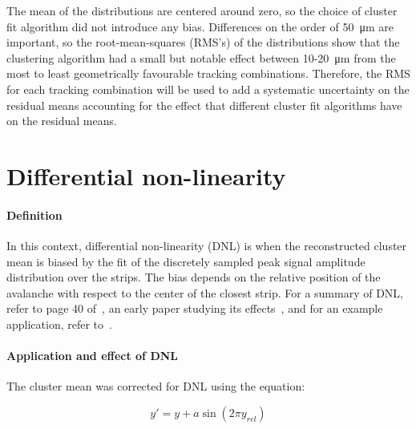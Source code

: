 The mean of the distributions are centered around zero, so the choice of cluster fit algorithm did not introduce any bias. Differences on the order of \SI{50}{\micro\meter} are important, so the root-mean-squares (RMS's) of the distributions show that the clustering algorithm had a small but notable effect between 10-\SI{20}{\micro\meter} from the most to least geometrically favourable tracking combinations. Therefore, the RMS for each tracking combination will be used to add a systematic uncertainty on the residual means accounting for the effect that different cluster fit algorithms have on the residual means.

\section{Differential non-linearity}
\label{appendix:systematics_dnl}

\paragraph*{Definition} \hfill \break
In this context, differential non-linearity (DNL) is when the reconstructed cluster mean is biased by the fit of the discretely sampled peak signal amplitude distribution over the strips. The bias depends on the relative position of the avalanche with respect to the center of the closest strip. For a summary of DNL, refer to page 40 of~\cite{lefebvre_thesis}, an early paper studying its effects~\cite{endo_systematic_1981}, and for an example application, refer to~\cite{abusleme_performance_2016}. 

\paragraph*{Application and effect of DNL} \hfill \break
The cluster mean was corrected for DNL using the equation:

\begin{equation}
\label{eqn:dnl_corr}
y' = y + a \sin \left( 2 \pi y_{rel} \right)
\end{equation}


